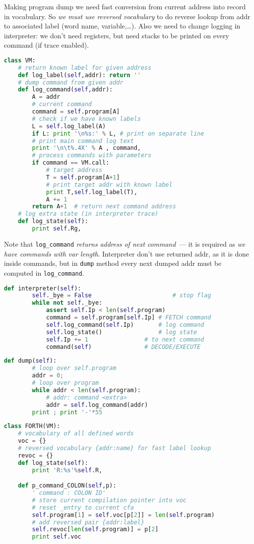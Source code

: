 Making program dump we need fast conversion from current address into record in
vocabulary. So \emph{we must use reversed vocabulary} to do reverse lookup from
addr to associated label (word name, variable,\ldots).
Also we need to change logging in interpreter: we don't need registers, but
need stacks to be printed on every command (if trace enabled).
\begin{lstlisting}[language=Python]
class VM:
	# return known label for given address
	def log_label(self,addr): return ''
	# dump command from given addr
	def log_command(self,addr):
		A = addr
		# current command
		command = self.program[A]
		# check if we have known labels
		L = self.log_label(A)
		if L: print '\n%s:' % L, # print on separate line
		# print main command log text
		print '\n\t%.4X' % A , command,
		# process commands with parameters
		if command == VM.call:
			# target address
			T = self.program[A+1]
			# print target addr with known label
			print T,self.log_label(T),
			A += 1
		return A+1	# return next command address
	# log extra state (in interpreter trace)
	def log_state(self):
		print self.Rg,
\end{lstlisting}
Note that \verb|log_command| \emph{returns address of next command}\ --- it is
required as \emph{we have commands with var length}. Interpreter don't use
returned addr, as it is done inside commands, but in \verb|dump| method every
next dumped addr must be computed in
\verb|log_command|.
\begin{lstlisting}[language=Python]
	def interpreter(self):
		self._bye = False		   				# stop flag
		while not self._bye:
			assert self.Ip < len(self.program)
			command = self.program[self.Ip]	# FETCH command
			self.log_command(self.Ip)		# log command
			self.log_state()				# log state
			self.Ip += 1				# to next command
			command(self)				# DECODE/EXECUTE
\end{lstlisting}
\begin{lstlisting}[language=Python]
   	def dump(self):
 		# loop over self.program
 		addr = 0;
 		# loop over program 
 		while addr < len(self.program):
 			# addr: command <extra>
 			addr = self.log_command(addr)
   		print ; print '-'*55
\end{lstlisting}
\begin{lstlisting}[language=Python]
class FORTH(VM):
	# vocabulary of all defined words
	voc = {}
	# reversed vocabulary {addr:name} for fast label lookup
	revoc = {}
	def log_state(self):
		print 'R:%s'%self.R,

  	def p_command_COLON(self,p):
  		' command : COLON ID'
  		# store current compilation pointer into voc
		# reset _entry to current cfa
  		self.program[1] = self.voc[p[2]] = len(self.program)
  		# add reversed pair {addr:label}
  		self.revoc[len(self.program)] = p[2]
		print self.voc
\end{lstlisting}
